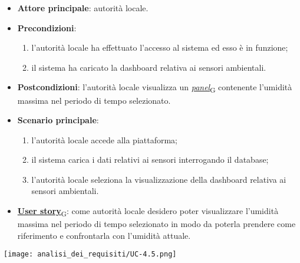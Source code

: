 \begin{itemize}
	\item \textbf{Attore principale}: autorità locale.
	\item \textbf{Precondizioni}:
	      \begin{enumerate}
		      \item l'autorità locale ha effettuato l'accesso al sistema ed esso è in funzione;
		      \item il sistema ha caricato la dashboard relativa ai sensori ambientali.
	      \end{enumerate}
	\item \textbf{Postcondizioni}: l'autorità locale visualizza un \href{https://7last.github.io/docs/rtb/documentazione-interna/glossario\#panel}{\textit{panel}\textsubscript{G}} contenente l'umidità massima nel periodo di tempo selezionato.
	\item \textbf{Scenario principale}:
	      \begin{enumerate}
		      \item l'autorità locale accede alla piattaforma;
		      \item il sistema carica i dati relativi ai sensori interrogando il database;
		      \item l'autorità locale seleziona la visualizzazione della dashboard relativa ai sensori ambientali.
	      \end{enumerate}
	\item \href{https://7last.github.io/docs/rtb/documentazione-interna/glossario\#user-story}{\textbf{User story}\textsubscript{G}}:
	      come autorità locale desidero poter visualizzare l'umidità massima nel periodo di tempo selezionato
	      in modo da poterla prendere come riferimento e confrontarla con l'umidità attuale.
\end{itemize}
\begin{center}
	\texttt{[image: analisi\_dei\_requisiti/UC-4.5.png]}
\end{center}


